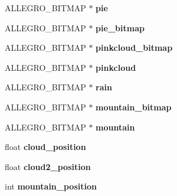 \begin{DoxyCompactItemize}
\item 
\hypertarget{structMenu_a397eb035f88ef8138c4ba29f3fc1d63c}{\-A\-L\-L\-E\-G\-R\-O\-\_\-\-B\-I\-T\-M\-A\-P $\ast$ {\bfseries pie}}\label{structMenu_a397eb035f88ef8138c4ba29f3fc1d63c}

\item 
\hypertarget{structMenu_ab46ce3041264bac0aabde3abd7549877}{\-A\-L\-L\-E\-G\-R\-O\-\_\-\-B\-I\-T\-M\-A\-P $\ast$ {\bfseries pie\-\_\-bitmap}}\label{structMenu_ab46ce3041264bac0aabde3abd7549877}

\item 
\hypertarget{structMenu_a970ef9c492ae797fc59d22fa6cfead71}{\-A\-L\-L\-E\-G\-R\-O\-\_\-\-B\-I\-T\-M\-A\-P $\ast$ {\bfseries pinkcloud\-\_\-bitmap}}\label{structMenu_a970ef9c492ae797fc59d22fa6cfead71}

\item 
\hypertarget{structMenu_aec110fca9c47ccf9aaf6e4e7589b86f2}{\-A\-L\-L\-E\-G\-R\-O\-\_\-\-B\-I\-T\-M\-A\-P $\ast$ {\bfseries pinkcloud}}\label{structMenu_aec110fca9c47ccf9aaf6e4e7589b86f2}

\item 
\hypertarget{structMenu_a3ba357f6bd47ac51f9aa9b9c381bbe9f}{\-A\-L\-L\-E\-G\-R\-O\-\_\-\-B\-I\-T\-M\-A\-P $\ast$ {\bfseries rain}}\label{structMenu_a3ba357f6bd47ac51f9aa9b9c381bbe9f}

\item 
\hypertarget{structMenu_a115b21e5dcfdcf1393e3b5d3b041a7b7}{\-A\-L\-L\-E\-G\-R\-O\-\_\-\-B\-I\-T\-M\-A\-P $\ast$ {\bfseries mountain\-\_\-bitmap}}\label{structMenu_a115b21e5dcfdcf1393e3b5d3b041a7b7}

\item 
\hypertarget{structMenu_a3a957c0b3a961e3c2be9001c15e82208}{\-A\-L\-L\-E\-G\-R\-O\-\_\-\-B\-I\-T\-M\-A\-P $\ast$ {\bfseries mountain}}\label{structMenu_a3a957c0b3a961e3c2be9001c15e82208}

\item 
\hypertarget{structMenu_a0e6c60743147ff2ead1e0bb2f89d0036}{float {\bfseries cloud\-\_\-position}}\label{structMenu_a0e6c60743147ff2ead1e0bb2f89d0036}

\item 
\hypertarget{structMenu_a143c3675204c7cf1381decbfe4be5476}{float {\bfseries cloud2\-\_\-position}}\label{structMenu_a143c3675204c7cf1381decbfe4be5476}

\item 
\hypertarget{structMenu_a10770a9453a92c77d64c7fdb0e34e725}{int {\bfseries mountain\-\_\-position}}\label{structMenu_a10770a9453a92c77d64c7fdb0e34e725}


\end{DoxyCompactItemize}
